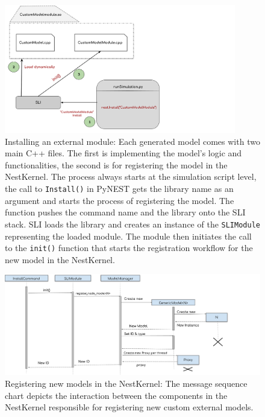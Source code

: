 \begin{figure}[ht!]
\centering
\includegraphics[width=0.9\textwidth]{src/pic/install_command.png}
\caption{Installing an external module: Each generated model comes with two main C++ files. The first is implementing the model's logic and functionalities, the second is for registering the model in the NestKernel. The process always starts at the simulation script level, the call to \texttt{Install()} in PyNEST gets the library name as an argument and starts the process of registering the model. The function pushes the command name and the library onto the SLI stack. SLI loads the library and creates an instance of the \texttt{SLIModule} representing the loaded module. The module then initiates the call to the \texttt{init()} function that starts the registration workflow for the new model in the NestKernel.}
\label{fig:sli_install}
\end{figure}

\vspace{0.5cm}
\begin{figure}[ht!]
\centering
\includegraphics[width=\textwidth]{src/pic/register.png}
\caption{Registering new models in the NestKernel: The message sequence chart depicts the interaction between the components in the NestKernel responsible for registering new custom external models.}
\label{fig:nestkernel_register}
\end{figure}

